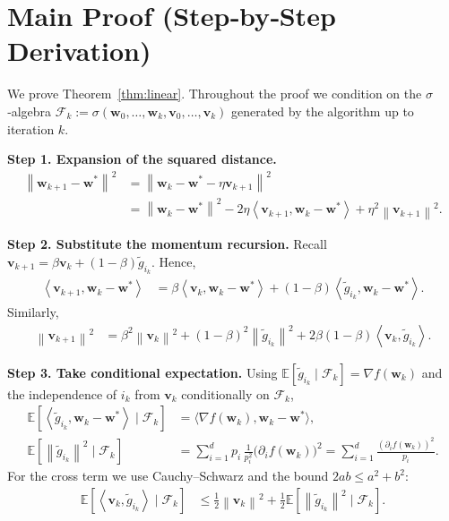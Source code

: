 \documentclass{article}
\newcommand{\E}{\mathbb{E}}
\newcommand{\norm}[1]{\left\|#1\right\|}
\newcommand{\ip}[2]{\left\langle #1,#2\right\rangle}
\begin{document}
\section*{Main Proof (Step‑by‑Step Derivation)}
We prove Theorem~\ref{thm:linear}.  Throughout the proof we condition on the
$\sigma$‑algebra $\mathcal F_k:=\sigma(\mathbf w_0,\dots ,\mathbf w_k,
\mathbf v_0,\dots ,\mathbf v_k)$ generated by the algorithm up to iteration $k$.

\bigskip
\noindent\textbf{Step 1.  Expansion of the squared distance.}
\begin{align}
\norm{\mathbf w_{k+1}-\mathbf w^{*}}^{2}
&=\norm{\mathbf w_{k}-\mathbf w^{*}-\eta\mathbf v_{k+1}}^{2} \nonumber\\
&=\norm{\mathbf w_{k}-\mathbf w^{*}}^{2}
-2\eta\ip{\mathbf v_{k+1}}{\mathbf w_{k}-\mathbf w^{*}}
+\eta^{2}\norm{\mathbf v_{k+1}}^{2}.
\tag{Step 1}
\end{align}

\noindent\textbf{Step 2.  Substitute the momentum recursion.}
Recall $\mathbf v_{k+1}= \beta\mathbf v_{k}+(1-\beta)\tilde g_{i_k}$.
Hence,
\begin{align}
\ip{\mathbf v_{k+1}}{\mathbf w_{k}-\mathbf w^{*}}
&= \beta\ip{\mathbf v_{k}}{\mathbf w_{k}-\mathbf w^{*}}
  +(1-\beta)\ip{\tilde g_{i_k}}{\mathbf w_{k}-\mathbf w^{*}}.
\tag{Step 2}
\end{align}
Similarly,
\begin{align}
\norm{\mathbf v_{k+1}}^{2}
&= \beta^{2}\norm{\mathbf v_{k}}^{2}
   +(1-\beta)^{2}\norm{\tilde g_{i_k}}^{2}
   +2\beta(1-\beta)\ip{\mathbf v_{k}}{\tilde g_{i_k}}.
\tag{Step 3}
\end{align}

\noindent\textbf{Step 3.  Take conditional expectation.}
Using $\E[\tilde g_{i_k}\mid\mathcal F_k]=\nabla f(\mathbf w_k)$ and
the independence of $i_k$ from $\mathbf v_k$ conditionally on $\mathcal F_k$,
\begin{align}
\E\!\left[\ip{\tilde g_{i_k}}{\mathbf w_{k}-\mathbf w^{*}}\mid\mathcal F_k\right]
&= \bigl\langle \nabla f(\mathbf w_k),\mathbf w_{k}-\mathbf w^{*}\bigr\rangle,
\tag{Step 4}
\\[4pt]
\E\!\left[\norm{\tilde g_{i_k}}^{2}\mid\mathcal F_k\right]
&= \sum_{i=1}^{d}p_i\,
   \frac{1}{p_i^{2}}\bigl(\partial_i f(\mathbf w_k)\bigr)^{2}
   =\sum_{i=1}^{d}\frac{(\partial_i f(\mathbf w_k))^{2}}{p_i}.
\tag{Step 5}
\end{align}
For the cross term we use Cauchy–Schwarz and the bound $2ab\le a^{2}+b^{2}$:
\begin{align}
\E\!\left[\ip{\mathbf v_{k}}{\tilde g_{i_k}}\mid\mathcal F_k\right]
&\le \frac{1}{2}\norm{\mathbf v_{k}}^{2}
   +\frac{1}{2}\E\!\left[\norm{\tilde g_{i_k}}^{2}\mid\mathcal F_k\right].
\tag{Step 6}
\end{align}
\end{document}
